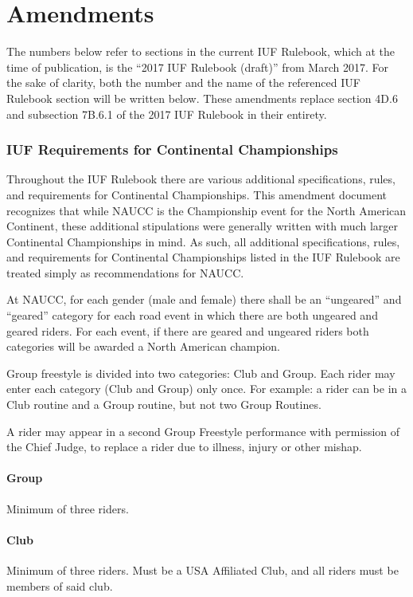 \part{Amendments}
\parttoc
{}

The numbers below refer to sections in the current IUF Rulebook, which at the time of publication, is the ``2017 IUF Rulebook (draft)'' from March 2017. For the sake of clarity, both the number and the name of the referenced IUF Rulebook section will be written below. These amendments replace section 4D.6 and subsection 7B.6.1 of the 2017 IUF Rulebook in their entirety.

\section{IUF Requirements for Continental Championships}
Throughout the IUF Rulebook there are various additional specifications, rules, and requirements for Continental Championships.
This amendment document recognizes that while NAUCC is the Championship event for the North American Continent, these additional stipulations were generally written with much larger Continental Championships in mind.
As such, all additional specifications, rules, and requirements for Continental Championships listed in the IUF Rulebook are treated simply as recommendations for NAUCC.

At NAUCC, for each gender (male and female) there shall be an ``ungeared'' and ``geared'' category for each road event in which there are both ungeared and geared riders.
For each event, if there are geared and ungeared riders both categories will be awarded a North American champion.

Group freestyle is divided into two categories: Club and Group.
Each rider may enter each category (Club and Group) only once.
For example: a rider can be in a Club routine and a Group routine, but not two Group Routines.

A rider may appear in a second Group Freestyle performance with permission of the Chief Judge, to replace a rider due to illness, injury or other mishap.

\subsection{Group}
Minimum of three riders.

\subsection{Club}
Minimum of three riders. Must be a USA Affiliated Club, and all riders must be members of said club.

